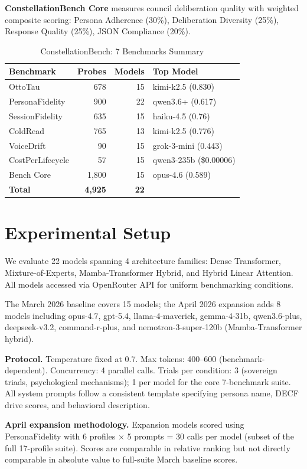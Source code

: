 \documentclass[conference]{IEEEtran}
\begin{document}
\textbf{ConstellationBench Core} measures council deliberation quality with weighted composite scoring: Persona Adherence (30\%), Deliberation Diversity (25\%), Response Quality (25\%), JSON Compliance (20\%).

\begin{table}[ht]
\centering
\caption{ConstellationBench: 7 Benchmarks Summary}
\begin{tabular}{lrrl}
\toprule
Benchmark & Probes & Models & Top Model \\
\midrule
OttoTau & 678 & 15 & kimi-k2.5 (0.830) \\
PersonaFidelity & 900 & 22 & qwen3.6+ (0.617) \\
SessionFidelity & 635 & 15 & haiku-4.5 (0.76) \\
ColdRead & 765 & 13 & kimi-k2.5 (0.776) \\
VoiceDrift & 90 & 15 & grok-3-mini (0.443) \\
CostPerLifecycle & 57 & 15 & qwen3-235b (\$0.00006) \\
Bench Core & 1,800 & 15 & opus-4.6 (0.589) \\
\midrule
\textbf{Total} & \textbf{4,925} & \textbf{22} & \\
\bottomrule
\end{tabular}
\end{table}

\section{Experimental Setup}

We evaluate 22 models spanning 4 architecture families: Dense Transformer, Mixture-of-Experts, Mamba-Transformer Hybrid, and Hybrid Linear Attention. All models accessed via OpenRouter API for uniform benchmarking conditions.

The March 2026 baseline covers 15 models; the April 2026 expansion adds 8 models including opus-4.7, gpt-5.4, llama-4-maverick, gemma-4-31b, qwen3.6-plus, deepseek-v3.2, command-r-plus, and nemotron-3-super-120b (Mamba-Transformer hybrid).

\textbf{Protocol.} Temperature fixed at 0.7. Max tokens: 400--600 (benchmark-dependent). Concurrency: 4 parallel calls. Trials per condition: 3 (sovereign triads, psychological mechanisms); 1 per model for the core 7-benchmark suite. All system prompts follow a consistent template specifying persona name, DECF drive scores, and behavioral description.

\textbf{April expansion methodology.} Expansion models scored using PersonaFidelity with 6 profiles $\times$ 5 prompts = 30 calls per model (subset of the full 17-profile suite). Scores are comparable in relative ranking but not directly comparable in absolute value to full-suite March baseline scores.
\end{document}
